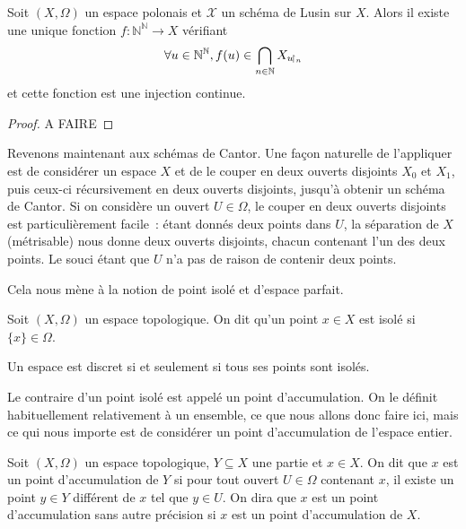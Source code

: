 \begin{proposition}
  Soit $(X,\Omega)$ un espace polonais et $\mathcal X$ un schéma de Lusin sur
  $X$. Alors il existe une unique fonction $f : \mathbb N^\mathbb N \to X$
  vérifiant
  \[\forall u \in \mathbb N^\mathbb N, f(u) \in
  \bigcap_{n \in \mathbb N} X_{u\!\upharpoonright_{n}}\]
  et cette fonction est une injection continue.
\end{proposition}

\begin{proof}
  A FAIRE
\end{proof}

Revenons maintenant aux schémas de Cantor. Une façon naturelle de l'appliquer
est de considérer un espace $X$ et de le couper en deux ouverts disjoints
$X_0$ et $X_1$, puis ceux-ci récursivement en deux ouverts disjoints, jusqu'à
obtenir un schéma de Cantor. Si on considère un ouvert $U\in \Omega$, le
couper en deux ouverts disjoints est particulièrement facile~: étant donnés deux
points dans $U$, la séparation de $X$ (métrisable) nous donne deux ouverts
disjoints, chacun contenant l'un des deux points. Le souci étant que $U$ n'a pas
de raison de contenir deux points.

Cela nous mène à la notion de point isolé et d'espace parfait.

\begin{definition}
  Soit $(X,\Omega)$ un espace topologique. On dit qu'un point $x\in X$ est isolé
  si $\{x\}\in\Omega$.
\end{definition}

\begin{remark}
  Un espace est discret si et seulement si tous ses points sont isolés.
\end{remark}

Le contraire d'un point isolé est appelé un point d'accumulation. On le définit
habituellement relativement à un ensemble, ce que nous allons donc faire ici,
mais ce qui nous importe est de considérer un point d'accumulation de l'espace
entier.

\begin{definition}
  Soit $(X,\Omega)$ un espace topologique, $Y\subseteq X$ une partie et
  $x\in X$. On dit que $x$ est un point d'accumulation de $Y$ si pour tout
  ouvert $U\in\Omega$ contenant $x$, il existe un point $y\in Y$ différent de
  $x$ tel que $y\in U$. On dira que $x$ est un point d'accumulation sans
  autre précision si $x$ est un point d'accumulation de $X$.
\end{definition}

